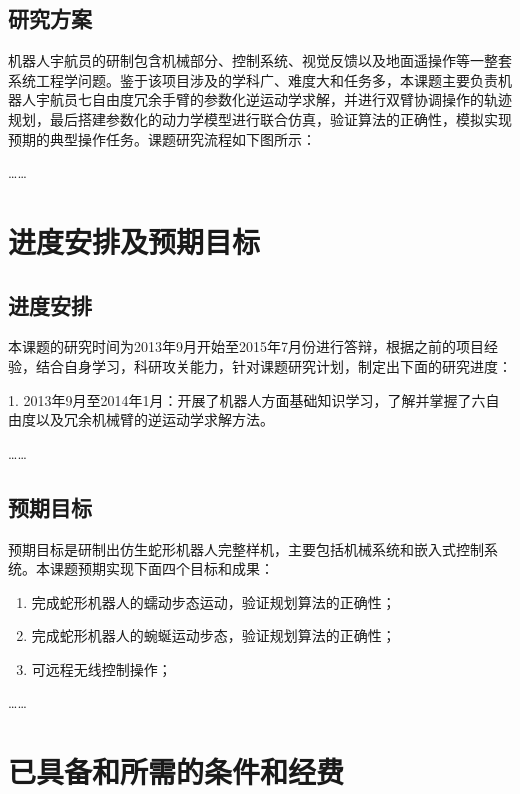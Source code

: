 \hitenter

\subsection{研究方案}

机器人宇航员的研制包含机械部分、控制系统、视觉反馈以及地面遥操作等一整套系统工程学问题。鉴于该项目涉及的学科广、难度大和任务多，本课题主要负责机器人宇航员七自由度冗余手臂的参数化逆运动学求解，并进行双臂协调操作的轨迹规划，最后搭建参数化的动力学模型进行联合仿真，验证算法的正确性，模拟实现预期的典型操作任务。课题研究流程如下图所示：

……

\section{进度安排及预期目标}

\subsection{进度安排}

本课题的研究时间为2013年9月开始至2015年7月份进行答辩，根据之前的项目经验，结合自身学习，科研攻关能力，针对课题研究计划，制定出下面的研究进度：

1. 2013年9月至2014年1月：开展了机器人方面基础知识学习，了解并掌握了六自由度以及冗余机械臂的逆运动学求解方法。

……

\hitenter

\subsection{预期目标}

预期目标是研制出仿生蛇形机器人完整样机，主要包括机械系统和嵌入式控制系统。本课题预期实现下面四个目标和成果：

\begin{enumerate}
  \item 完成蛇形机器人的蠕动步态运动，验证规划算法的正确性；
  \item 完成蛇形机器人的蜿蜒运动步态，验证规划算法的正确性；
  \item 可远程无线控制操作；
\end{enumerate}

……

\section{已具备和所需的条件和经费}

